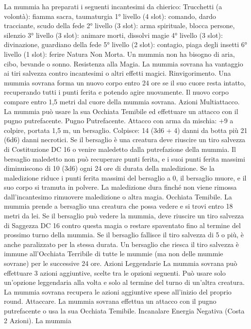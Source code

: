 \begin{multicols}{2}
La mummia ha preparati i seguenti incantesimi da chierico:
Trucchetti (a volontà): fiamma sacra, taumaturgia
1° livello (4 slot): comando, dardo tracciante, scudo della fede
2° livello (3 slot): arma spirituale, blocca persone, silenzio
3° livello (3 slot): animare morti, dissolvi magie
4° livello (3 slot): divinazione, guardiano della fede
5° livello (2 slot): contagio, piaga degli insetti
6° livello (1 slot): ferire
Natura Non Morta. Un mummia non ha bisogno di aria, cibo,
bevande o sonno.
Resistenza alla Magia. La mummia sovrana ha vantaggio ai tiri
salvezza contro incantesimi o altri effetti magici.
Rinvigorimento. Una mummia sovrana forma un nuovo corpo
entro 24 ore se il suo cuore resta intatto, recuperando tutti i punti
ferita e potendo agire nuovamente. Il nuovo corpo compare entro
1,5 metri dal cuore della mummia sovrana.
Azioni
Multiattacco. La mummia può usare la sua Occhiata Temibile ed
effettuare un attacco con il pugno putrefacente.
Pugno Putrefacente. Attacco con arma da mischia: +9 a colpire,
portata 1,5 m, un bersaglio.
Colpisce: 14 (3d6 + 4) danni da botta più 21 (6d6) danni
necrotici. Se il bersaglio è una creatura deve riuscire un tiro
salvezza di Costituzione DC 16 o venire maledetto dalla
putrefazione della mummia. Il bersaglio maledetto non può
recuperare punti ferita, e i suoi punti ferita massimi diminuiscono
di 10 (3d6) ogni 24 ore di durata della maledizione. Se la
maledizione riduce i punti ferita massimi del bersaglio a 0, il
bersaglio muore, e il suo corpo si tramuta in polvere. La
maledizione dura finché non viene rimossa dall’incantesimo
rimuovere maledizione o altra magia.
Occhiata Temibile. La mummia prende a bersaglio una creatura
che possa vedere e si trovi entro 18 metri da lei. Se il bersaglio
può vedere la mummia, deve riuscire un tiro salvezza di
Saggezza DC 16 contro questa magia o restare spaventato fino al
termine del prossimo turno della mummia. Se il bersaglio fallisce
il tiro salvezza di 5 o più, è anche paralizzato per la stessa durata.
Un bersaglio che riesca il tiro salvezza è immune all’Occhiata
Terribile di tutte le mummie (ma non delle mummie sovrane) per
le successive 24 ore.
Azioni Leggendarie
La mummia sovrana può effettuare 3 azioni aggiuntive, scelte
tra le opzioni seguenti. Può usare solo un’opzione leggendaria
alla volta e solo al termine del turno di un’altra creatura. La
mummia sovrana recupera le azioni aggiuntive spese all’inizio
del proprio round.
Attaccare. La mummia sovrana effettua un attacco con il pugno
putrefacente o usa la sua Occhiata Temibile.
Incanalare Energia Negativa (Costa 2 Azioni). La mummia

\end{multicols}
